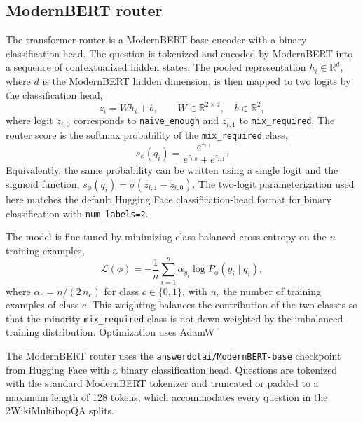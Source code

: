 \documentclass[english, bibtex]{kththesis}               %
\numberwithin{listing}{chapter}
\providecommand{\DIFaddtex}[1]{{\protect\color{blue} \sf #1}} %
\providecommand{\DIFdeltex}[1]{{\protect\color{red} \scriptsize #1}} %
\providecommand{\DIFaddbegin}{} %
\providecommand{\DIFaddend}{} %
\providecommand{\DIFdelbegin}{} %
\providecommand{\DIFdelend}{} %
\providecommand{\DIFadd}[1]{\texorpdfstring{\DIFaddtex{#1}}{#1}} %
\providecommand{\DIFdel}[1]{\texorpdfstring{\DIFdeltex{#1}}{}} %
\begin{document}
\DIFaddend \subsection{ModernBERT router}
\label{sec:methodModernBert}

The transformer router is a ModernBERT-base \cite{warner2024modernbert} encoder with a binary classification head. The question is tokenized and encoded by ModernBERT into a sequence of contextualized hidden states. The pooled representation \(h_i \in \mathbb{R}^{d}\), where \(d\) is the ModernBERT hidden dimension, is then mapped to two logits by the classification head,
\begin{equation}
\label{eq:modernBertLogits}
z_i = W h_i + b,
\qquad
W \in \mathbb{R}^{2 \times d}, \quad b \in \mathbb{R}^{2},
\end{equation}
where logit \(z_{i,0}\) corresponds to \texttt{naive\_enough} and \(z_{i,1}\) to \texttt{mix\_required}. The router score is the softmax probability of the \texttt{mix\_required} class,
\begin{equation}
\label{eq:modernBertSoftmax}
s_\phi(q_i)
=
\frac{e^{z_{i,1}}}{e^{z_{i,0}} + e^{z_{i,1}}}.
\end{equation}
Equivalently, the same probability can be written using a single logit and the sigmoid function, $s_\phi(q_i) = \sigma(z_{i,1} - z_{i,0})$. The two-logit parameterization used here matches the default Hugging Face classification-head format for binary classification with \texttt{num\_labels=2}.

The model is fine-tuned by minimizing class-balanced cross-entropy on the \(n\) training examples,
\begin{equation}
\label{eq:modernBertLoss}
\mathcal{L}(\phi)
=
-\frac{1}{n}\sum_{i=1}^{n}
\alpha_{y_i} \log P_\phi(y_i \mid q_i),
\end{equation}
where \(\alpha_{c} = n / (2\,n_c)\) for class \(c \in \{0, 1\}\), with \(n_c\) the number of training examples of class \(c\). This weighting balances the contribution of the two classes so that the minority \texttt{mix\_required} class is not down-weighted by the imbalanced training distribution.
\DIFdelbegin \DIFdel{Optimization uses AdamW }\DIFdelend \DIFaddbegin 

\DIFadd{The ModernBERT router uses the \texttt{answerdotai/ModernBERT-base} checkpoint from Hugging Face \cite{warner2024modernbert} with a binary classification head. Questions are tokenized with the standard ModernBERT tokenizer and truncated or padded to a maximum length of 128 tokens, which accommodates every question in the 2WikiMultihopQA splits.
}
\end{document}

